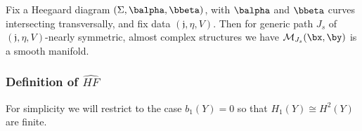 \begin{thm}
Fix a Heegaard diagram $(\Sigma,\balpha,\bbeta)$, with $\balpha$ and $\bbeta$ curves intersecting transversally, and fix data $(\mathfrak j,\eta,V)$. Then for generic path $J_s$ of $(\mathfrak j,\eta,V)$-nearly symmetric, almost complex structures we have $\mathcal M_{J_s}(\bx,\by)$ is a smooth manifold.
\end{thm}













\subsubsection*{Definition of $\widehat{HF}$}

For simplicity we will restrict to the case $b_1(Y) = 0$ so that $H_1(Y) \cong H^2(Y)$ are finite. 


